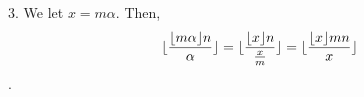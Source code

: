 \documentclass{article}
\DeclarePairedDelimiter\floor{\lfloor}{\rfloor}
\begin{document}
3. We let \(x = m\alpha\). Then, \[\floor{\frac{\floor{m\alpha}n}{\alpha}}=\floor{\frac{\floor{x}n}{\frac{x}{m}}}=\floor{\frac{\floor{x}mn}{x}}\].
\end{document}
